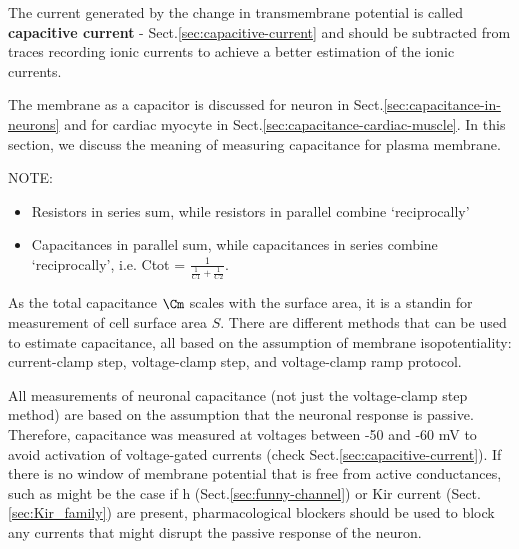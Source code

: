 The current generated by the change in transmembrane potential is called {\bf
capacitive current} - Sect.\ref{sec:capacitive-current} and should be subtracted
from traces recording ionic currents to achieve a better estimation of the
ionic currents.

The membrane as a capacitor is discussed for neuron in
Sect.\ref{sec:capacitance-in-neurons} and for cardiac myocyte in
Sect.\ref{sec:capacitance-cardiac-muscle}. In this section, we discuss the
meaning of measuring capacitance for plasma membrane.
 
NOTE: 
\begin{itemize}
  \item  Resistors in series sum, while resistors in
parallel combine `reciprocally'

  \item Capacitances in parallel sum, while capacitances
in series combine `reciprocally', i.e. Ctot =
$\frac{1}{\frac{1}{C1}+\frac{1}{C2}}$.
\end{itemize}


As the total capacitance $\Cm$ scales with the surface area, it is a standin for
measurement of cell surface area $S$. There are different methods that can be
used to estimate capacitance, all based on the assumption of membrane
isopotentiality:
current-clamp step, voltage-clamp step, and voltage-clamp ramp protocol.

All measurements of neuronal capacitance (not just the  voltage-clamp  step
method)  are  based  on  the  assumption  that  the  neuronal  response  is
passive. Therefore, capacitance was measured at voltages between -50 and -60 mV
to avoid activation of voltage-gated currents (check
Sect.\ref{sec:capacitive-current}).
If there is no window of membrane potential that is free from active
conductances, such as might be the case if h (Sect.\ref{sec:funny-channel}) or
Kir current (Sect.\ref{sec:Kir_family}) are present, pharmacological blockers
should be used to block any currents that might disrupt the passive response of
the neuron.

